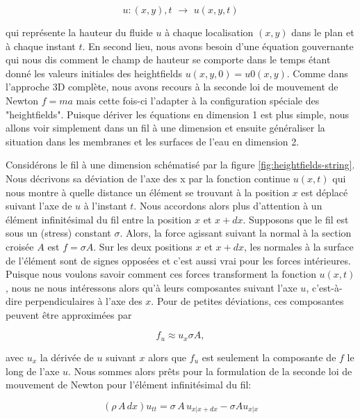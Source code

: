\documentclass[11pt]{report}
\begin{document}
\begin{equation}
u: (x,y),t \,\, \longrightarrow \,\, u(x,y,t)
\end{equation}

qui représente la hauteur du fluide $u$ à chaque localisation $(x,y)$ dans le plan et à chaque instant $t$. En second lieu, nous avons besoin d'une équation gouvernante qui nous dis comment le champ de hauteur se comporte dans le temps étant donné les valeurs initiales des heightfields $u(x,y,0) = u0(x,y)$. Comme dans l'approche 3D complète, nous avons recours à la seconde loi de mouvement de Newton $f = ma$ mais cette fois-ci l'adapter à la configuration spéciale des "heightfields". Puisque dériver les équations en dimension 1 est plus simple, nous allons voir simplement dans un fil à une dimension et ensuite généraliser la situation dans les membranes et les surfaces de l'eau en dimension 2.

Considérons le fil à une dimension schématisé par la figure \ref{fig:heightfields-string}. Nous décrivons sa déviation de l'axe des x par la fonction continue $u(x,t)$ qui nous montre à quelle distance un élément se trouvant à la position $x$ est déplacé suivant l'axe de $u$ à l'instant $t$. Nous accordons alors plus d'attention à un élément infinitésimal du fil entre la position $x$ et $x + dx$. Supposons que le fil est sous un (stress) constant $\sigma$. Alors, la force agissant suivant la normal à la section croisée $A$ est $f = \sigma A$. Sur les deux positions $x$ et $x + dx$, les normales à la surface de l'élément sont de signes opposées et c'est aussi vrai pour les forces intérieures. Puisque nous voulons savoir comment ces forces transforment la fonction $u(x,t)$, nous ne nous intéressons alors qu'à leurs composantes suivant l'axe $u$, c'est-à-dire perpendiculaires à l'axe des $x$. Pour de petites déviations, ces composantes peuvent être approximées par 

\begin{equation}
f_u \approx u_x \sigma A,
\end{equation} 

avec $u_x$ la dérivée de $u$ suivant $x$ alors que $f_u$ est seulement la composante de $f$ le long de l'axe $u$. Nous sommes alors prêts pour la formulation de la seconde loi de mouvement de Newton pour l'élément infinitésimal du fil:

\begin{equation}
(\rho\, A\, dx)u_{tt} = \sigma\, A \,u_{x|x+dx} - \sigma A u_{x|x}
\end{equation}
\end{document}
